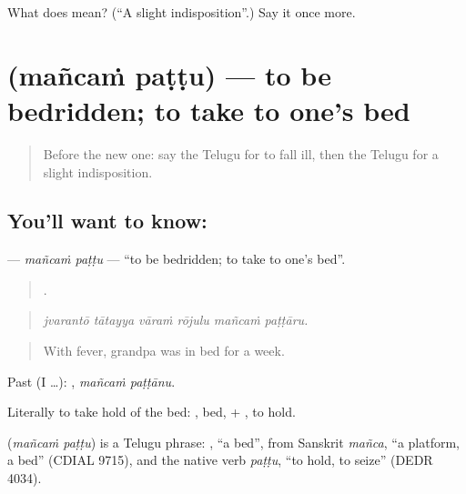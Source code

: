 \begin{tcolorbox}[breakable,colback=teal!4,colframe=teal!35!black,title={Before you move on}]
What does  mean? (\textquotedblleft{}A slight indisposition\textquotedblright{}.) Say it once more.
\end{tcolorbox}
\section[\texorpdfstring{\te{మంచం} \te{పట్టు} (mañcaṁ paṭṭu)}{మంచం పట్టు (mañcaṁ paṭṭu)}]{  (mañcaṁ paṭṭu) — to be bedridden; to take to one's bed}

\label{lesson:TE-C512-mancam-pattu}



\begin{quote}
Before the new one: say the Telugu for to fall ill, then the Telugu for a slight indisposition.
\end{quote}

\subsection*{You'll want to know:  }
\textbf{ } — \emph{mañcaṁ paṭṭu} — \textquotedblleft{}to be bedridden; to take to one's bed\textquotedblright{}.

\begin{quote}
     .
\end{quote}

\begin{quote}
\emph{jvarantō tātayya vāraṁ rōjulu mañcaṁ paṭṭāru.}
\end{quote}

\begin{quote}
With fever, grandpa was in bed for a week.
\end{quote}

Past (I …):  , \emph{mañcaṁ paṭṭānu}.

Literally to take hold of the bed: , bed, + , to hold.

\begin{cousinweb}
\textbf{ } (\emph{mañcaṁ paṭṭu}) is a Telugu phrase: , \textquotedblleft{}a bed\textquotedblright{}, from Sanskrit \emph{mañca}, \textquotedblleft{}a platform, a bed\textquotedblright{} (CDIAL 9715), and the native verb \emph{paṭṭu}, \textquotedblleft{}to hold, to seize\textquotedblright{} (DEDR 4034).
\end{cousinweb}

